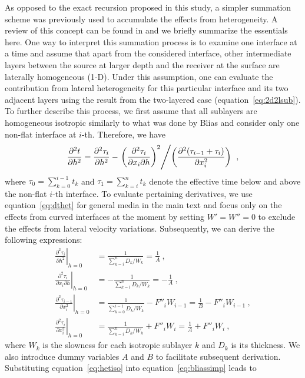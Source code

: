 As opposed to the exact recursion proposed in this study, a simpler summation scheme was previously used to accumulate the effects from heterogeneity. A review of this concept can be found in \cite{blias2006} and we briefly summarize the essentials here. One way to interpret this summation process is to examine one interface at a time and assume that apart from the considered interface, other intermediate layers between the source at larger depth and the receiver at the surface are laterally homogeneous (1-D). Under this assumption, one can evaluate the contribution from lateral heterogeneity for this particular interface and its two adjacent layers using the result from the two-layered case (equation~\ref{eq:2d2lsub}). To further describe this process, we first assume that all sublayers are homogeneous isotropic similarly to what was done by Blias and consider only one non-flat interface at $i$-th. Therefore, we have
\begin{equation}
\label{eq:bliassimp}
\frac{\partial^2 t}{\partial h^2} = \frac{\partial^2 \tau_i}{\partial h^2} - \left. \left(\frac{\partial^2 \tau_i }{ \partial x_i \partial h}\right)^2 \middle/ \left(\frac{\partial^2 (\tau_{i-1}+\tau_i) }{ \partial x_i^2} \right) \right. ~,
\end{equation}
where $\tau_0 = \sum^{i-1}_{k=0} t_k$ and $\tau_1 = \sum^n_{k=i} t_k$ denote the effective time below and above the non-flat $i$-th interface. To evaluate pertaining derivatives, we use equation~\ref{eq:dthet} for general media in the main text and focus only on the effects from curved interfaces at the moment by setting $W' = W'' = 0$ to exclude the effects from lateral velocity variations. Subsequently, we can derive the following expressions:
\begin{align}
\label{eq:hetiso}
\left. \frac{\partial^2 \tau_i }{\partial h^2} \right\rvert_{h=0} & = \frac{1}{\sum^n_{k=i} D_k/W_k} = \frac{1}{A}~,\\
\nonumber
\left. \frac{\partial^2 \tau_i }{ \partial x_i \partial h} \right\rvert_{h=0} & =  -\frac{1}{\sum^n_{k=i} D_k/W_k} = -\frac{1}{A} ~,\\
\nonumber
\left. \frac{\partial^2 \tau_{i-1} }{ \partial x_i^2} \right\rvert_{h=0} & =  \frac{1}{\sum^{i-1}_{k=0} D_k/W_k}- F''_iW_{i-1} = \frac{1}{B} - F''_iW_{i-1}  ~,\\
\nonumber
\left. \frac{\partial^2 \tau_i }{ \partial x_i^2} \right\rvert_{h=0} & =  \frac{1}{\sum^n_{k=i} D_k/W_k}+ F''_iW_i = \frac{1}{A} + F''_iW_i~,
\end{align}
where $W_k$ is the slowness for each isotropic sublayer $k$ and $D_k$ is its thickness. We also introduce dummy variables $A$ and $B$ to facilitate subsequent derivation.  Substituting equation~\ref{eq:hetiso} into equation~\ref{eq:bliassimp} leads to
